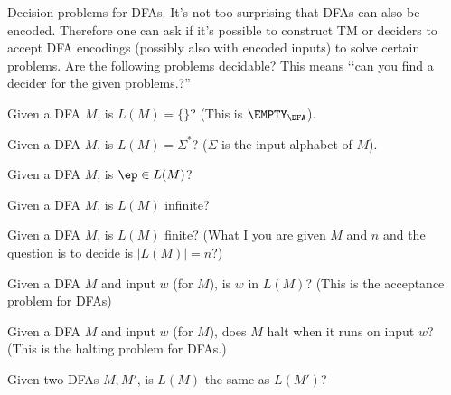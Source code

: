   Decision problems for DFAs.
  It's not too surprising that DFAs can also be encoded.
  Therefore one can ask if it's possible to construct TM or deciders
  to accept DFA encodings (possibly also with encoded  inputs) to
  solve certain problems.
  Are the following problems decidable?
  This means \lq\lq can you find a decider for the given problems.?''
  \begin{tightlist}
    \item Given a DFA $M$, is $L(M) = \{\}$?
    (This is $\EMPTY_\DFA$).
    \item Given a DFA $M$, is $L(M) = \Sigma^*$? ($\Sigma$ is the
    input alphabet of $M$).
    \item Given a DFA $M$, is $\ep \in L(M)$?
    \item Given a DFA $M$, is $L(M)$ infinite?
    \item Given a DFA $M$, is $L(M)$ finite? (What I you are given $M$ and $n$
      and the question is to decide is $|L(M)| = n$?)
    \item Given a DFA $M$ and input $w$ (for $M$), is $w$ in $L(M)$?
    (This is the acceptance problem for DFAs)
    \item Given a DFA $M$ and input $w$ (for $M$), does $M$ halt when
    it runs on input $w$?
    (This is the halting problem for DFAs.)
    \item Given two DFAs $M, M'$, is $L(M)$ the same as $L(M')$?
  \end{tightlist}
